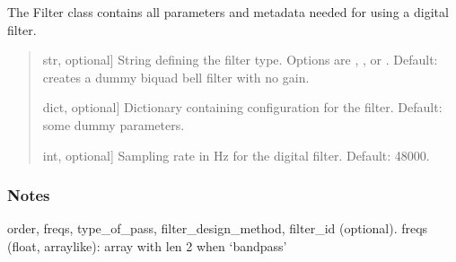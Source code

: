 \documentclass[letterpaper,10pt,english]{sphinxmanual}
\begin{document}
\begin{fulllineitems}
\begin{fulllineitems}
\label{\detokenize{classes:dsptoolbox.classes.filter_class.Filter.__init__}}
\pysigstartsignatures
{}
\pysigstopsignatures
\sphinxAtStartPar
The Filter class contains all parameters and metadata needed for
using a digital filter.
\begin{quote}\begin{description}
\begin{description}
\sphinxlineitem{\sphinxstylestrong{filter\_type}}{[}str, optional{]}
\sphinxAtStartPar
String defining the filter type. Options are , ,
 or . Default: creates a dummy biquad bell filter
with no gain.

\sphinxlineitem{\sphinxstylestrong{filter\_configuration}}{[}dict, optional{]}
\sphinxAtStartPar
Dictionary containing configuration for the filter.
Default: some dummy parameters.

\sphinxlineitem{\sphinxstylestrong{sampling\_rate\_hz}}{[}int, optional{]}
\sphinxAtStartPar
Sampling rate in Hz for the digital filter. Default: 48000.

\end{description}

\end{description}\end{quote}
\subsubsection*{Notes}
\begin{description}
\sphinxAtStartPar
order, freqs, type\_of\_pass, filter\_design\_method,
filter\_id (optional).
freqs (float, array\sphinxhyphen{}like): array with len 2 when ‘bandpass’
\begin{quote}


\end{quote}
\end{description}
\end{fulllineitems}
\end{fulllineitems}
\end{document}
